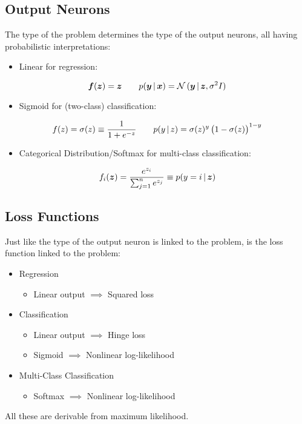 	\subsection{Output Neurons}
		The type of the problem determines the type of the output neurons, all having probabilistic interpretations:
		\begin{itemize}
			\item Linear for regression:
		\end{itemize}
		\begin{equation}
			\bm{f}(\bm{z}) = \bm{z} \qquad p(\bm{y} \,\vert\, \bm{x}) = \mathcal{N}\,(\bm{y} \,\vert\, \bm{z}, \sigma^2 I)
		\end{equation}
		\begin{itemize}
			\item Sigmoid for (two-class) classification:
		\end{itemize}
		\begin{equation}
			f(z) = \sigma(z) \equiv \frac{1}{1 + e^{-z}} \qquad p(y \,\vert\, z) = \sigma(z)^y \, \big( 1 - \sigma(z) \big)^{1 - y}
		\end{equation}
		\begin{itemize}
			\item Categorical Distribution/Softmax for multi-class classification:
		\end{itemize}
		\begin{equation}
			f_i(\bm{z}) = \frac{e^{z_i}}{\sum_{j = 1}^{n} e^{z_j}} \equiv p(y = i \,\vert\, \bm{z})
		\end{equation}

	\subsection{Loss Functions}
		Just like the type of the output neuron is linked to the problem, is the loss function linked to the problem:
		\begin{itemize}
			\item Regression
				\begin{itemize}
					\item Linear output \(\implies\) Squared loss
				\end{itemize}
			\item Classification
				\begin{itemize}
					\item Linear output \(\implies\) Hinge loss
					\item Sigmoid \(\implies\) Nonlinear log-likelihood
				\end{itemize}
			\item Multi-Class Classification
				\begin{itemize}
					\item Softmax \(\implies\) Nonlinear log-likelihood
				\end{itemize}
		\end{itemize}
		All these are derivable from maximum likelihood.

